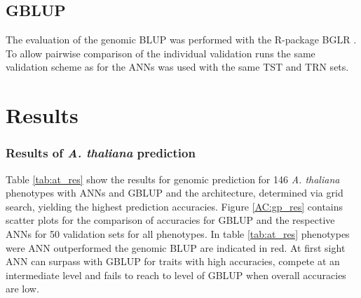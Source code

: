 \subsection{GBLUP}

The evaluation of the genomic BLUP was performed with the R-package BGLR \cite{BGLR}. To allow pairwise
comparison of the individual validation runs the same validation scheme as for the ANNs was used with the same
TST and TRN sets. 

\section{Results} \label{res:gp}
\subsubsection{Results of \textit{A. thaliana} prediction}
Table \ref{tab:at_res} show the results for genomic prediction for 146 \textit{A. thaliana} phenotypes with
ANNs and GBLUP and the architecture, determined via grid search, yielding the highest prediction accuracies.
Figure \ref{AC:gp_res} contains scatter plots for the comparison of accuracies for GBLUP and the respective
ANNs for 50 validation sets for all phenotypes.  In table \ref{tab:at_res} phenotypes were ANN outperformed
the genomic BLUP are indicated in red. At first sight ANN can surpass with GBLUP for traits with high
accuracies, compete at an intermediate level and fails to reach to level of GBLUP when overall accuracies are
low.

